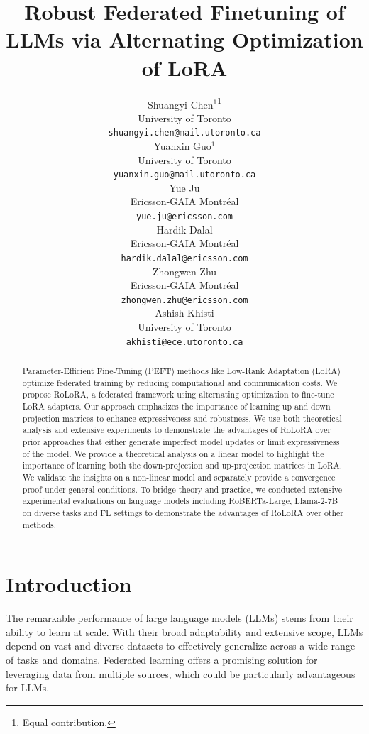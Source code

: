 \documentclass{article}
\title{Robust Federated Finetuning of LLMs via Alternating Optimization of LoRA}
\author{%
  Shuangyi Chen$^{1}$\thanks{Equal contribution.}\\
  University of Toronto\\
  {\small\texttt{shuangyi.chen@mail.utoronto.ca}} \\
  \And
  Yuanxin Guo$^{1}$\footnotemark[1] \\
  University of Toronto \\
  {\small\texttt{yuanxin.guo@mail.utoronto.ca}}\\
  \AND
  Yue Ju \\
  Ericsson-GAIA Montréal \\
  {\small\texttt{yue.ju@ericsson.com}} \\
  \And
  Hardik Dalal  \\
  Ericsson-GAIA Montréal \\
  {\small\texttt{hardik.dalal@ericsson.com}} \\
  \And
  Zhongwen Zhu \\
  Ericsson-GAIA Montréal \\
  {\small\texttt{zhongwen.zhu@ericsson.com}} \\
  \And
  Ashish Khisti \\
  University of Toronto \\
  {\small\texttt{akhisti@ece.utoronto.ca}} \\
}
\theoremstyle{plain}
\theoremstyle{definition}
\theoremstyle{remark}
\begin{document}
\maketitle

\begin{abstract}
  Parameter-Efficient Fine-Tuning (PEFT) methods like Low-Rank Adaptation (LoRA) optimize federated training by reducing computational and communication costs.  We propose RoLoRA, a federated framework using alternating optimization to fine-tune LoRA adapters. Our approach emphasizes the importance of learning up and down projection matrices to enhance expressiveness and robustness. We use both theoretical analysis and extensive experiments to demonstrate the advantages of RoLoRA over prior approaches that either generate imperfect model updates or limit expressiveness of the model. We provide a theoretical analysis on a linear model to highlight the importance of learning both the down-projection and up-projection matrices in LoRA. We validate the insights on a non-linear model and separately provide a convergence proof under general conditions. To bridge theory and practice, we conducted extensive experimental evaluations on language models including RoBERTa-Large, Llama-2-7B on diverse tasks and FL settings to demonstrate the advantages of RoLoRA over other methods.
\end{abstract}


\section{Introduction}\label{intro}
The remarkable performance of large language models (LLMs) stems from their ability to learn at scale. With their broad adaptability and extensive scope, LLMs depend on vast and diverse datasets to effectively generalize across a wide range of tasks and domains. Federated learning \cite{mcmahan2017communication} offers a promising solution for leveraging data from multiple sources, which could be  particularly advantageous for LLMs.
\end{document}
